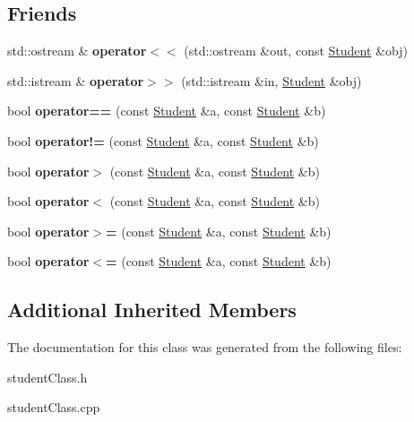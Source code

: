 \subsection*{Friends}
\begin{DoxyCompactItemize}
\item 
\mbox{\label{class_student_a7e2de65ff4fcd5c355fe325fe7ecc628}} 
std\+::ostream \& {\bfseries operator$<$$<$} (std\+::ostream \&out, const \mbox{\hyperlink{class_student}{Student}} \&obj)
\item 
\mbox{\label{class_student_ae33c8269151fe808e7ca20d9b29a82ef}} 
std\+::istream \& {\bfseries operator$>$$>$} (std\+::istream \&in, \mbox{\hyperlink{class_student}{Student}} \&obj)
\item 
\mbox{\label{class_student_a3964d3cf585d930b3e6c9eb6379ba41f}} 
bool {\bfseries operator==} (const \mbox{\hyperlink{class_student}{Student}} \&a, const \mbox{\hyperlink{class_student}{Student}} \&b)
\item 
\mbox{\label{class_student_a4643d09d419d6f688192fe759cebbad0}} 
bool {\bfseries operator!=} (const \mbox{\hyperlink{class_student}{Student}} \&a, const \mbox{\hyperlink{class_student}{Student}} \&b)
\item 
\mbox{\label{class_student_a8e8f9cb02695bbd70ae3f6af951d59c0}} 
bool {\bfseries operator$>$} (const \mbox{\hyperlink{class_student}{Student}} \&a, const \mbox{\hyperlink{class_student}{Student}} \&b)
\item 
\mbox{\label{class_student_ae65f7355c5b9e95117aaf9bc93660ce9}} 
bool {\bfseries operator$<$} (const \mbox{\hyperlink{class_student}{Student}} \&a, const \mbox{\hyperlink{class_student}{Student}} \&b)
\item 
\mbox{\label{class_student_ac4cc7f272c704f41a99407c32130ea0f}} 
bool {\bfseries operator$>$=} (const \mbox{\hyperlink{class_student}{Student}} \&a, const \mbox{\hyperlink{class_student}{Student}} \&b)
\item 
\mbox{\label{class_student_a69e41c3e46d67c367756caad801aada5}} 
bool {\bfseries operator$<$=} (const \mbox{\hyperlink{class_student}{Student}} \&a, const \mbox{\hyperlink{class_student}{Student}} \&b)
\end{DoxyCompactItemize}
\subsection*{Additional Inherited Members}


The documentation for this class was generated from the following files\+:\begin{DoxyCompactItemize}
\item 
student\+Class.\+h\item 
student\+Class.\+cpp\end{DoxyCompactItemize}
